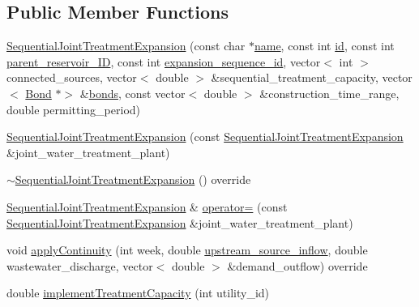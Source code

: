 \subsection*{Public Member Functions}
\begin{DoxyCompactItemize}
\item 
\mbox{\hyperlink{classSequentialJointTreatmentExpansion_ad3ca28eaaa041be6ebbd0a4593d5c9ab}{Sequential\+Joint\+Treatment\+Expansion}} (const char $\ast$\mbox{\hyperlink{classWaterSource_a846ea74c5b453d014f594d41fee8c765}{name}}, const int \mbox{\hyperlink{classWaterSource_a6eafe5dfefd317877d1244e8a7c6e742}{id}}, const int \mbox{\hyperlink{classSequentialJointTreatmentExpansion_a43b9e27138606bbbf8e5ef0279232a0a}{parent\+\_\+reservoir\+\_\+\+ID}}, const int \mbox{\hyperlink{classSequentialJointTreatmentExpansion_adeaf6ba2bcfc4c024e332764144e3021}{expansion\+\_\+sequence\+\_\+id}}, vector$<$ int $>$ connected\+\_\+sources, vector$<$ double $>$ \&sequential\+\_\+treatment\+\_\+capacity, vector$<$ \mbox{\hyperlink{classBond}{Bond}} $\ast$$>$ \&\mbox{\hyperlink{classWaterSource_a413b094e11bdce62f4d82e5bb9e4706e}{bonds}}, const vector$<$ double $>$ \&construction\+\_\+time\+\_\+range, double permitting\+\_\+period)
\item 
\mbox{\hyperlink{classSequentialJointTreatmentExpansion_a677aa8de08ba7116216509b1a6d74b14}{Sequential\+Joint\+Treatment\+Expansion}} (const \mbox{\hyperlink{classSequentialJointTreatmentExpansion}{Sequential\+Joint\+Treatment\+Expansion}} \&joint\+\_\+water\+\_\+treatment\+\_\+plant)
\item 
\mbox{\hyperlink{classSequentialJointTreatmentExpansion_a77d4270fd89d172739fdede5b9e6c1e9}{$\sim$\+Sequential\+Joint\+Treatment\+Expansion}} () override
\item 
\mbox{\hyperlink{classSequentialJointTreatmentExpansion}{Sequential\+Joint\+Treatment\+Expansion}} \& \mbox{\hyperlink{classSequentialJointTreatmentExpansion_a53413658de78fecdb2e0d451a20eb82c}{operator=}} (const \mbox{\hyperlink{classSequentialJointTreatmentExpansion}{Sequential\+Joint\+Treatment\+Expansion}} \&joint\+\_\+water\+\_\+treatment\+\_\+plant)
\item 
void \mbox{\hyperlink{classSequentialJointTreatmentExpansion_a64fdd68fc68f6b1145291575c2116815}{apply\+Continuity}} (int week, double \mbox{\hyperlink{classWaterSource_a7a69b2e9b6030f1035e6cf44d2918ee5}{upstream\+\_\+source\+\_\+inflow}}, double wastewater\+\_\+discharge, vector$<$ double $>$ \&demand\+\_\+outflow) override
\item 
double \mbox{\hyperlink{classSequentialJointTreatmentExpansion_a06a2e9479bd639661cd8241e571c5711}{implement\+Treatment\+Capacity}} (int utility\+\_\+id)
\end{DoxyCompactItemize}
